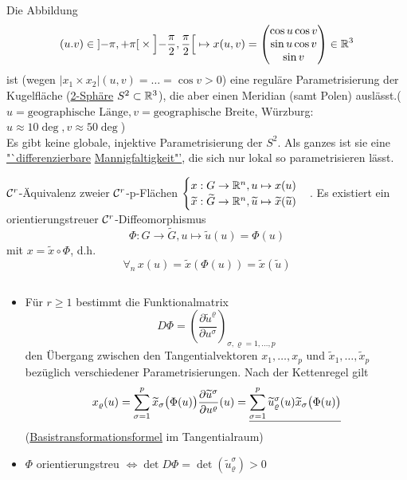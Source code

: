 \begin{bsp}
Die Abbildung 
\[\left( u.v \right) \in \left]-\pi , + \pi \right[ \times \left]-\frac{\pi}{2}, \frac{\pi}{2} \right[ \mapsto x (u, v) = \begin{pmatrix}
                                                                                                                \cos u \cos v\\
														  \sin u \cos v\\
														   \sin v
                                                                                                               \end{pmatrix} \in \mathbb{R}^3
\] 
ist (wegen \(|x_1 \times x_2|(u,v) = \ldots = \cos v > 0\)) eine reguläre Parametrisierung der Kugelfläche (\uline{2-Sphäre} \(S^2 \subset \mathbb{R}^3\)), die aber einen Meridian (samt Polen) auslässt.(\(u = \text{geographische Länge}, v= \text{geographische Breite}\), Würzburg: \(u \approx 10 \deg, v \approx 50 \deg\))\\
Es gibt keine globale, injektive Parametrisierung der \(S^2\). Als ganzes ist sie eine \underline{"`differenzierbare} \underline{Mannigfaltigkeit"'}, die sich nur lokal so parametrisieren lässt.
\end{bsp}

\begin{definition}[\(\C^r\)-Äquivalenz]
\(\C^r\)-Äquivalenz zweier \(\C^r\)-p-Flächen
\(\begin{cases}
x : G \rightarrow \mathbb{R}^n, u \mapsto x(u)\\
\widetilde x : \widetilde G \rightarrow \mathbb{R}^n, \widetilde u \mapsto \widetilde x( \widetilde u)
\end{cases}\).
Es existiert ein orientierungstreuer \(\C^r\)-Diffeomorphismus 
\[\Phi : G \rightarrow \widetilde G, u \mapsto \widetilde u (u) = \Phi (u)\] 
mit \(x = \widetilde x \circ \Phi\), d.h. 
\[\forall_{n} \, x(u) = \widetilde x (\Phi(u)) = \widetilde x (\widetilde u)\]
\end{definition}

\begin{bemerkung} \(\)
\begin{itemize}
 \item Für \(r \geq 1\) bestimmt die Funktionalmatrix 
 \[D\Phi = \left( \frac{\partial \widetilde u^\varrho}{\partial u^\sigma}\right)_{\sigma, \varrho = 1, \dots , p}\] 
 den Übergang zwischen den Tangentialvektoren \(x_1, \dots , x_p\) und \(\widetilde x_1, \dots , \widetilde x_p\) bezüglich verschiedener Parametrisierungen. Nach der Kettenregel gilt
\[
 x_{\varrho}(u) = \sum_{\sigma = 1}^{p} \widetilde x_\sigma \big(\Phi(u)\big) \frac{\partial \widetilde u^\sigma}{\partial u^\varrho} (u) = \uline{\sum_{\sigma = 1}^{p} \widetilde u_\varrho^\sigma (u) \widetilde x_\sigma \big(\Phi(u)\big)}
\]
(\uline{Basistransformationsformel} im Tangentialraum)
 \item \(\Phi\) orientierungstreu \(\Leftrightarrow \det D\Phi = \det \left(\widetilde u_\varrho^\sigma\right) > 0\)
\end{itemize}
\end{bemerkung}

